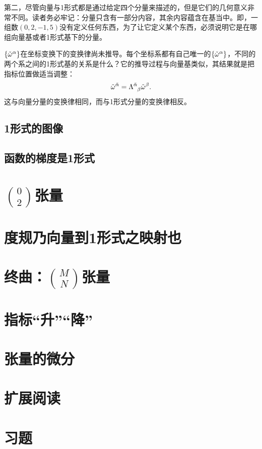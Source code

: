 第二，尽管向量与1形式都是通过给定四个分量来描述的，但是它们的几何意义非常不同。读者务必牢记：分量只含有一部分内容，其余内容蕴含在基当中。即，一组数$(0, 2, -1, 5)$没有定义任何东西，为了让它定义某个东西，必须说明它是在哪组向量基或者1形式基下的分量。

$\{ \tilde{\omega}^\alpha \}$在坐标变换下的变换律尚未推导。每个坐标系都有自己唯一的$\{ \tilde{\omega}^\alpha \}$，不同的两个系之间的1形式基的关系是什么？它的推导过程与向量基类似，其结果就是把指标位置做适当调整：
\begin{equation}
    \TOmg^{\bar{\alpha}} = \Lambda\indices{^{\bar{\alpha}}_{\beta}} \TOmg^\beta. \label{equ3.13}
\end{equation}
这与向量分量的变换律相同，而与1形式分量的变换律相反。

\subsection*{1形式的图像}


\subsection*{函数的梯度是1形式}


\section{$\binom{0}{2}$张量}
\label{sec3.4}

\section{度规乃向量到1形式之映射也}
\label{sec3.5}

\section{终曲：$\binom{M}{N}$张量}
\label{sec3.6}

\section{指标“升”“降”}
\label{sec3.7}

\section{张量的微分}
\label{sec3.8}

\section{扩展阅读}
\label{sec3.9}

\section{习题}
\label{sec3.10}